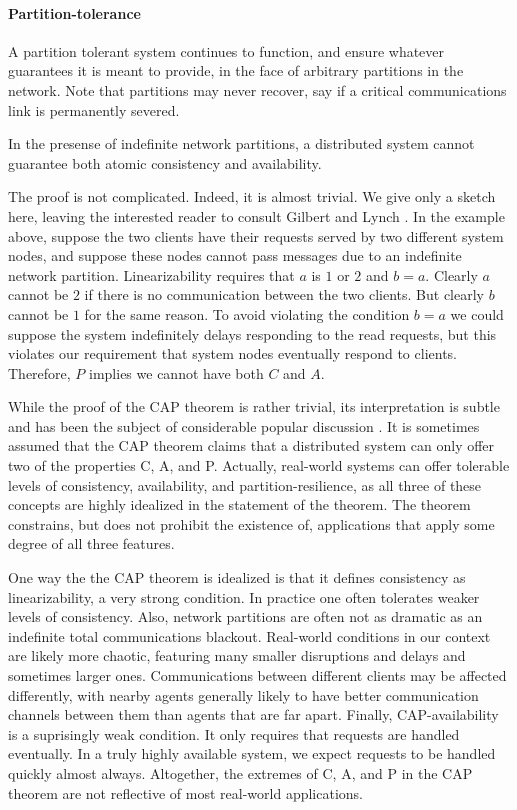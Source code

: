 \paragraph{Partition-tolerance}

A partition tolerant system continues to function, and ensure whatever
guarantees it is meant to provide, in the face of arbitrary partitions
in the network. Note that partitions may never recover, say if a
critical communications link is permanently severed.

\begin{theorem}
In the presense of indefinite network partitions, a distributed system
cannot guarantee both atomic consistency and availability.
\end{theorem}

The proof is not complicated. Indeed, it is almost trivial. We give
only a sketch here, leaving the interested reader to consult Gilbert
and Lynch \cite{}. In the example above, suppose the two clients have
their requests served by two different system nodes, and suppose these
nodes cannot pass messages due to an indefinite network
partition. Linearizability requires that $a$ is $1$ or $2$ and $b =
a$.  Clearly $a$ cannot be $2$ if there is no communication between
the two clients. But clearly $b$ cannot be $1$ for the same reason.
To avoid violating the condition $b = a$ we could suppose the system
indefinitely delays responding to the read requests, but this violates
our requirement that system nodes eventually respond to
clients. Therefore, $P$ implies we cannot have both $C$ and $A$.

While the proof of the CAP theorem is rather trivial, its
interpretation is subtle and has been the subject of considerable
popular discussion \cite{}. It is sometimes assumed that the CAP theorem
claims that a distributed system can only offer two of the properties
C, A, and P. Actually, real-world systems can offer tolerable levels
of consistency, availability, and partition-resilience, as all three
of these concepts are highly idealized in the statement of the
theorem. The theorem constrains, but does not prohibit the existence
of, applications that apply some degree of all three features.

One way the the CAP theorem is idealized is that it defines
consistency as linearizability, a very strong condition. In practice
one often tolerates weaker levels of consistency. Also, network
partitions are often not as dramatic as an indefinite total
communications blackout. Real-world conditions in our context are
likely more chaotic, featuring many smaller disruptions and delays and
sometimes larger ones. Communications between different clients may be
affected differently, with nearby agents generally likely to have
better communication channels between them than agents that are far
apart. Finally, CAP-availability is a suprisingly weak condition. It
only requires that requests are handled eventually. In a truly highly
available system, we expect requests to be handled quickly almost
always. Altogether, the extremes of C, A, and P in the CAP theorem are
not reflective of most real-world applications.

